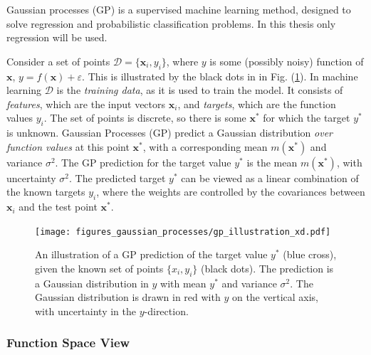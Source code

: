 \documentclass[twoside,english]{uiofysmaster}
\begin{document}
Gaussian processes (GP) is a supervised machine learning method, designed to solve regression and probabilistic classification problems. In this thesis only regression will be used. 


Consider a set of points $\mathcal{D} = \{\textbf{x}_i, y_i\}$, where $y$ is some (possibly noisy) function of $\textbf{x}$, $y = f(\textbf{x}) + \varepsilon$. This is illustrated by the black dots in in Fig. (\ref{Fig:: gaussian process : GP illustration}). In machine learning $\mathcal{D}$ is the \textit{training data}, as it is used to train the model. It consists of \textit{features}, which are the input vectors $\textbf{x}_i$, and \textit{targets}, which are the function values $y_i$. The set of points is discrete, so there is some $\textbf{x}^*$ for which the target $y^*$ is unknown. Gaussian Processes (GP) predict a Gaussian distribution \textit{over function values} at this point $\textbf{x}^*$, with a corresponding mean $m(\textbf{x}^*)$ and variance $\sigma^2$. The GP prediction for the target value $y^*$ is the mean $m(\textbf{x}^*)$, with uncertainty $\sigma^2$. The predicted target $y^*$ can be viewed as a linear combination of the known targets $y_i$, where the weights are controlled by the covariances between $\textbf{x}_i$ and the test point $\textbf{x}^*$.  


\begin{figure}
\centering
\texttt{[image: figures\_gaussian\_processes/gp\_illustration\_xd.pdf]}
\caption{An illustration of a GP prediction of the target value $y^*$ (blue cross), given the known set of points $\{x_i, y_i\}$ (black dots). The prediction is a Gaussian distribution in $y$ with mean $y^*$ and variance $\sigma^2$. The Gaussian distribution is drawn in red with $y$ on the vertical axis, with uncertainty in the $y$-direction.}
\label{Fig:: gaussian process : GP illustration}
\end{figure}

\subsubsection{Function Space View}
\end{document}
